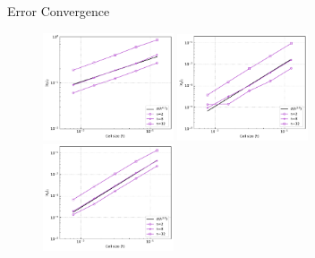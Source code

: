 \documentclass[10pt,aspectratio=169]{beamer}
\begin{document}
\begin{frame}[fragile]{Error Convergence}
\begin{figure}
		\begin{multicols}{3}
			\includegraphics[width=3.85cm]{../Annulus_Benchmark_Kramer/benchmark_figs/case1_k_0_p_err_conv_vel_penalty_2.5e+08_stokes_tol_1.0e-10.pdf}\par
			\hspace{-0.08in} 
			\includegraphics[width=3.85cm]{../Annulus_Benchmark_Kramer/benchmark_figs/case2_k_2_p_err_conv_vel_penalty_2.5e+08_stokes_tol_1.0e-10.pdf}\par
			\hspace{-0.12in}
			\includegraphics[width=3.85cm]{../Annulus_Benchmark_Kramer/benchmark_figs/case2_k_8_p_err_conv_vel_penalty_2.5e+08_stokes_tol_1.0e-10.pdf}
		\end{multicols}
	\end{figure}
\end{frame}
\end{document}
